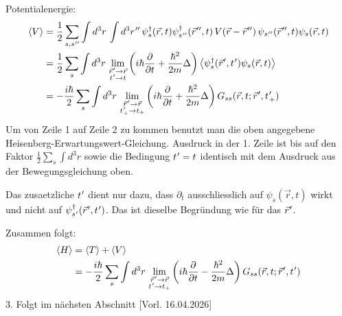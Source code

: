 Potentialenergie:
\begin{equation}
  \begin{aligned}
    \left\langle V\right\rangle
     & = \frac{1}{2}\sum_{s,s\mkern1mu''}\int d^3r\,\int d^3r\mkern1mu''\,\psi_s^{\dagger}(\vec{r},t)\psi_{s\mkern1mu''}^{\dagger}(\vec{r}\mkern1mu'',t)\,V(\vec{r}-\vec{r}\mkern1mu'')\,\psi_{s\mkern1mu''}(\vec{r}\mkern1mu'',t)\psi_s(\vec{r},t)                                                                                                                                                                    \\
     & = \frac{1}{2}\sum_s\int d^3r\,\lim_{\substack{\vec{r}\mkern1mu'\to\vec{r}                                                                                                                                                                    \\ t\mkern1mu'\to t}}\left(i\hbar\frac{\partial}{\partial t}+\frac{\hbar^2}{2m}\Delta\right)\left\langle\psi_s^{\dagger}(\vec{r}\mkern1mu',t\mkern1mu')\psi_s(\vec{r},t)\right\rangle \\
     & = -\frac{i\hbar}{2}\sum_s\int d^3r\,\lim_{\substack{\vec{r}\mkern1mu'\to\vec{r}                                                                                                                                                              \\ t\mkern1mu'_+\to t_{+}}}\left(i\hbar\frac{\partial}{\partial t}+\frac{\hbar^2}{2m}\Delta\right)G_{ss}(\vec{r},t;\vec{r}\mkern1mu',t\mkern1mu'_+)
  \end{aligned}
\end{equation}
Um von Zeile 1 auf Zeile 2 zu kommen benutzt man die oben angegebene Heisenberg-Erwartungswert-Gleichung. Ausdruck in der 1. Zeile ist bis auf den Faktor $\frac{1}{2}\sum\limits_s \int d^3r$ sowie die Bedingung $t\mkern1mu'=t$ identisch mit dem Ausdruck aus der Bewegungsgleichung oben.

Das zusaetzliche $t\mkern1mu'$ dient nur dazu, dass $\partial_t$ ausschliesslich auf $\psi_s(\vec{r},t)$ wirkt und
nicht auf $\psi_{s\mkern1mu'}^{\dagger}(\vec{r}\mkern1mu',t\mkern1mu')$. Das ist dieselbe Begründung wie für das
$\vec{r}\mkern1mu'$.

Zusammen folgt:
\begin{equation}
  \begin{aligned}
    \left\langle H\right\rangle
     & = \left\langle T\right\rangle+\left\langle V\right\rangle                                                                                                                                                                                                               \\
     & = -\frac{i\hbar}{2}\sum_s\int d^3r\,\lim_{\substack{\vec{r}\mkern1mu'\to\vec{r} \\ t\mkern1mu'\to t_{+}}}\left(i\hbar\frac{\partial}{\partial t}-\frac{\hbar^2}{2m}\Delta\right)G_{ss}(\vec{r},t;\vec{r}\mkern1mu',t\mkern1mu')
  \end{aligned}
\end{equation}
3. Folgt im nächsten Abschnitt
[Vorl. 16.04.2026]
